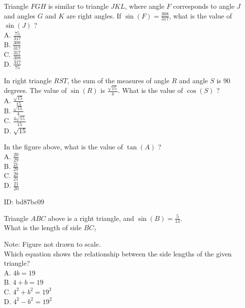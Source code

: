 

Triangle $F G H$ is similar to triangle $J K L$, where angle $F$ corresponds to angle $J$ and angles $G$ and $K$ are right angles. If $\sin (F)=\frac{308}{317}$, what is the value of $\sin (J)$ ?\\
A. $\frac{75}{317}$\\
B. $\frac{308}{317}$\\
C. $\frac{317}{308}$\\
D. $\frac{317}{75}$

In right triangle $R S T$, the sum of the measures of angle $R$ and angle $S$ is 90 degrees. The value of $\sin (R)$ is $\frac{\sqrt{15}}{4}$. What is the value of $\cos (S)$ ?\\
A. $\frac{\sqrt{15}}{15}$\\
B. $\frac{\sqrt{15}}{4}$\\
C. $\frac{4 \sqrt{15}}{15}$\\
D. $\sqrt{15}$

In the figure above, what is the value of $\tan (A)$ ?\\
A. $\frac{20}{29}$\\
B. $\frac{21}{29}$\\
C. $\frac{20}{21}$\\
D. $\frac{21}{20}$

ID: bd87bc09

Triangle $A B C$ above is a right triangle, and $\sin (B)=\frac{5}{13}$.\\
What is the length of side $\overline{B C}_{\text {? }}$











Note: Figure not drawn to scale.\\
Which equation shows the relationship between the side lengths of the given triangle?\\
A. $4 b=19$\\
B. $4+b=19$\\
C. $4^{2}+b^{2}=19^{2}$\\
D. $4^{2}-b^{2}=19^{2}$

















































